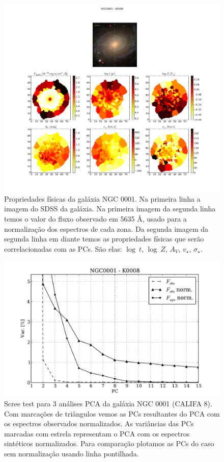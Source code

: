 \begin{figure}
    \includegraphics[width=1.\textwidth]{figuras/K0008-apresent.pdf}
    \caption[Propriedades f\'isicas da gal\'axia NGC 0001.]
    {Propriedades físicas da galáxia NGC 0001. Na primeira linha a imagem do SDSS da galáxia. Na primeira imagem da
    segunda linha temos o valor do fluxo observado em 5635 \AA, usado para a normalização dos espectros de cada zona. Da
    segunda imagem da segunda linha em diante temos as propriedades físicas que serão correlacionadas com as PCs. São
    elas: $\log\ t$, $\log\ Z$, $A_V$, $v_{\star}$, $\sigma_{\star}$.}
    \label{fig:K0008apresent}
\end{figure}

\begin{figure}
    \includegraphics[height=0.33\textheight]{figuras/K0008-screetest.pdf}
    \caption[Scree test comparativo entre 3 PCAs - NGC 0001.]
    {Scree test para 3 análises PCA da galáxia NGC 0001 (CALIFA 8). Com marcações de triângulos vemos as PCs
    resultantes do PCA com os espectros observados normalizados. As variâncias das PCs marcadas com estrela representam
    o PCA com os espectros sintéticos normalizados. Para comparação plotamos as PCs do caso sem normalização usando
    linha pontilhada.}
    \label{fig:K0008scree}
\end{figure}

